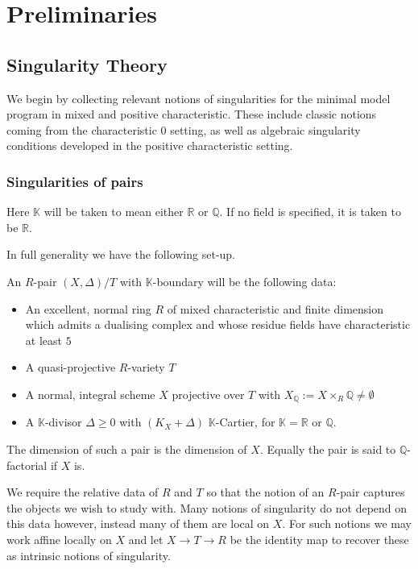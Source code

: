 \documentclass[a4paper,12pt]{book}
\begin{document}
\chapter{Preliminaries}
\section{Singularity Theory}

We begin by collecting relevant notions of singularities for the minimal model program in mixed and positive characteristic. These include classic notions coming from the characteristic $0$ setting, as well as algebraic singularity conditions developed in the positive characteristic setting.

\subsection{Singularities of pairs}
Here $\mathbb{K}$ will be taken to mean either $\mathbb{R}$ or $\mathbb{Q}$. If no field is specified, it is taken to be $\mathbb{R}$.

In full generality we have the following set-up.

\begin{definition}\label{setup}
	An $R$-pair $(X,\Delta)/ T$ with $\mathbb{K}$-boundary will be the following data:
	\begin{itemize}
		\item An excellent, normal ring $R$ of mixed characteristic and finite dimension which admits a dualising complex and whose residue fields have characteristic at least $5$
		\item A quasi-projective $R$-variety $T$
		\item A normal, integral scheme $X$ projective over $T$ with $X_{\mathbb{Q}}:=X \times_{R} \mathbb{Q} \neq \emptyset$ 
		\item A $\mathbb{K}$-divisor $\Delta \geq 0$ with $(K_{X}+\Delta)$ $\mathbb{K}$-Cartier, for $\mathbb{K}=\mathbb{R}$ or $\mathbb{Q}$.
	\end{itemize}
	
	The dimension of such a pair is the dimension of $X$. Equally the pair is said to $\mathbb{Q}$-factorial if $X$ is.
\end{definition}

\begin{remark}
	
	We require the relative data of $R$ and $T$ so that the notion of an $R$-pair captures the objects we wish to study with. Many notions of singularity do not depend on this data however, instead many of them are local on $X$. For such notions we may work affine locally on $X$ and let $X \to T \to R$ be the identity map to recover these as intrinsic notions of singularity.
	
\end{remark}
\end{document}
